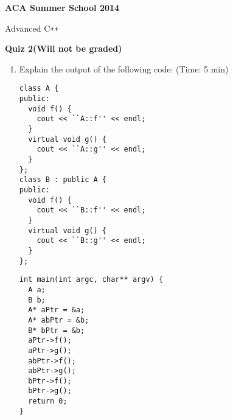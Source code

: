 \documentclass[12pt]{article}
\date{ }
\begin{document}
\begin{center}
\textbf{\LARGE{ACA Summer School 2014}}\vspace{.5cm}

\large{Advanced C\texttt{++}} \\ \vspace{.5cm}

\textbf{\large{Quiz 2}(Will not be graded)}\\
\end{center}

\begin{enumerate}
\item Explain the output of the following code: (Time: 5 min)
  \begin{multicols}{2}
    \begin{lstlisting}
class A {
public:
  void f() {
    cout << ``A::f'' << endl;
  }
  virtual void g() {
    cout << ``A::g'' << endl;
  }
};
class B : public A {
public:
  void f() {
    cout << ``B::f'' << endl;
  }
  virtual void g() {
    cout << ``B::g'' << endl;
  }
};
    \end{lstlisting}
    \columnbreak
    \begin{lstlisting}
int main(int argc, char** argv) {
  A a;
  B b;
  A* aPtr = &a;
  A* abPtr = &b;
  B* bPtr = &b;
  aPtr->f();
  aPtr->g();
  abPtr->f();
  abPtr->g();
  bPtr->f();
  bPtr->g();
  return 0;
}
    \end{lstlisting}
  \end{multicols}
\end{enumerate}
\end{document}
